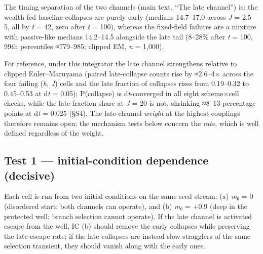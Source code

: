 \documentclass[11pt,letterpaper]{article}
\begin{document}
The timing separation of the two channels (main text, ``The late channel'') is: the wealth-fed baseline collapses are purely early (medians 14.7--17.0 across \emph{J} = 2.5--5, all by \emph{t} = 42, zero after \emph{t} = 100), whereas the fixed-field failures are a mixture with passive-like medians 14.2--14.5 alongside the late tail (8--28\% after \emph{t} = 100, 99th percentiles ≈779--985; clipped EM, \emph{n} = 1,000).

For reference, under this integrator the late channel strengthens relative to clipped Euler--Maruyama (paired late-collapse counts rise by ≈2.6--4× across the four failing (\emph{h}, \emph{J}) cells and the late fraction of collapses rises from 0.19--0.32 to 0.45--0.53 at d\emph{t} = 0.05); P(collapse) is d\emph{t}-converged in all eight scheme×cell checks, while the late-fraction share at \emph{J} = 20 is not, shrinking ≈8--13 percentage points at d\emph{t} = 0.025 (§S4). The late-channel \emph{weight} at the highest couplings therefore remains open; the mechanism tests below concern the \emph{rate}, which is well defined regardless of the weight.

\subsection{Test 1 --- initial-condition dependence (decisive)}\label{test-1-initial-condition-dependence-decisive}

Each cell is run from two initial conditions on the same seed stream: (a) \emph{m}₀ = 0 (disordered start; both channels can operate), and (b) \emph{m}₀ = +0.9 (deep in the protected well; branch selection cannot operate). If the late channel is activated escape from the well, IC (b) should remove the early collapses while preserving the late-escape rate; if the late collapses are instead slow stragglers of the same selection transient, they should vanish along with the early ones.
\end{document}
